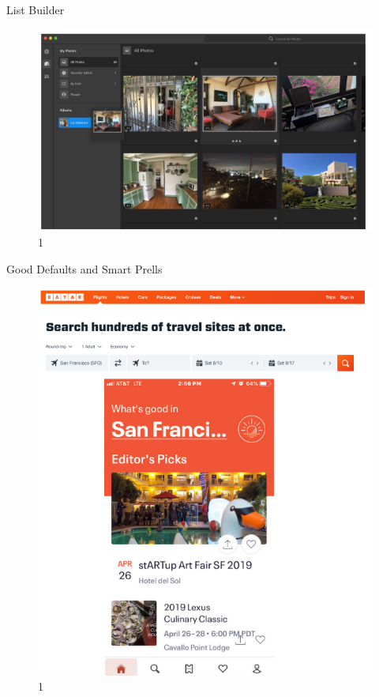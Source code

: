 \documentclass{beamer}
\begin{document}
\begin{frame}[t]{List Builder}
	\begin{figure}[h]
		\centering
		\includegraphics[scale=0.6]{images/lec08-pic59.png}
		\caption{1}
	\end{figure}
\end{frame}

\begin{frame}[t]{Good Defaults and Smart Prells}
	\begin{figure}[h]
		\centering
		\includegraphics[scale=0.6]{images/lec08-pic60.png}
		\caption{1}
	\end{figure}
\end{frame}
\end{document}
